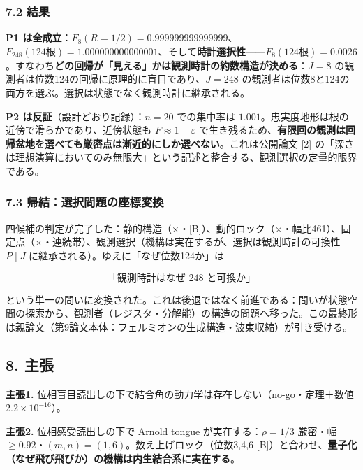 \documentclass[
  a4paper,
]{ltjsarticle}
\begin{document}
\subsubsection{7.2 結果}\label{ux7d50ux679c}

\textbf{P1
は全成立}：\(F_8(R{=}1/2)=0.999999999999999\)、\(F_{248}(\text{124根})=1.000000000000001\)、そして\textbf{時計選択性}------\(F_8(\text{124根})=0.0026\)。すなわち\textbf{どの回帰が「見える」かは観測時計の約数構造が決める}：\(J=8\)
の観測者は位数124の回帰に原理的に盲目であり、\(J=248\)
の観測者は位数8と124の両方を選ぶ。選択は状態でなく観測時計に継承される。

\textbf{P2 は反証}（設計どおり記録）：\(n=20\) での集中率は
\(1.001\)。忠実度地形は根の近傍で滑らかであり、近傍状態も
\(F\approx1-\varepsilon\)
で生き残るため、\textbf{有限回の観測は回帰盆地を選べても厳密点は漸近的にしか選べない}。これは公開論文
{[}2{]}
の「深さは理想演算においてのみ無限大」という記述と整合する、観測選択の定量的限界である。

\subsubsection{7.3
帰結：選択問題の座標変換}\label{ux5e30ux7d50ux9078ux629eux554fux984cux306eux5ea7ux6a19ux5909ux63db}

四候補の判定が完了した：静的構造（×・{[}B{]}）、動的ロック（×・幅比461）、固定点（×・連続帯）、観測選択（機構は実在するが、選択は観測時計の可換性
\(P\mid J\) に継承される）。ゆえに「なぜ位数124か」は

\[
\boxed{\text{「観測時計はなぜ 248 と可換か」}}
\]

という単一の問いに変換された。これは後退ではなく前進である：問いが状態空間の探索から、観測者（レジスタ・分解能）の構造の問題へ移った。この最終形は親論文（第9論文本体：フェルミオンの生成構造・波束収縮）が引き受ける。

\subsection{8. 主張}\label{ux4e3bux5f35}

\textbf{主張1.}
位相盲目読出しの下で結合角の動力学は存在しない（no-go・定理＋数値
\(2.2\times10^{-16}\)）。

\textbf{主張2.} 位相感受読出しの下で Arnold tongue
が実在する：\(\rho=1/3\) 厳密・幅
\(\ge0.92\)・\((m,n)=(1,6)\)。数え上げロック（位数3,4,6
{[}B{]}）と合わせ、\textbf{量子化（なぜ飛び飛びか）の機構は内生結合系に実在する}。
\end{document}
